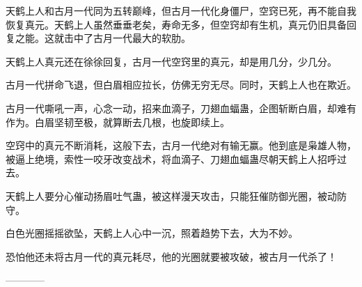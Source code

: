 \begin{this_body}
天鹤上人和古月一代同为五转巅峰，但古月一代化身僵尸，空窍已死，再不能自我恢复真元。天鹤上人虽然垂垂老矣，寿命无多，但空窍却有生机，真元仍旧具备回复之能。这就击中了古月一代最大的软肋。

天鹤上人真元还在徐徐回复，古月一代空窍里的真元，却是用几分，少几分。

古月一代拼命飞退，但白眉相应拉长，仿佛无穷无尽。同时，天鹤上人也在欺近。

古月一代嘶吼一声，心念一动，招来血滴子，刀翅血蝠蛊，企图斩断白眉，却难有作为。白眉坚韧至极，就算断去几根，也旋即续上。

空窍中的真元不断消耗，这般下去，古月一代绝对有输无赢。他到底是枭雄人物，被逼上绝境，索性一咬牙改变战术，将血滴子、刀翅血蝠蛊尽朝天鹤上人招呼过去。

天鹤上人要分心催动扬眉吐气蛊，被这样漫天攻击，只能狂催防御光圈，被动防守。

白色光圈摇摇欲坠，天鹤上人心中一沉，照着趋势下去，大为不妙。

恐怕他还未将古月一代的真元耗尽，他的光圈就要被攻破，被古月一代杀了！

------------

\end{this_body}

